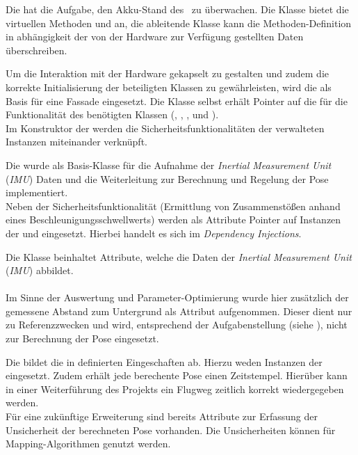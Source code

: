 
Die  hat die Aufgabe, den Akku-Stand des \Quad\ zu überwachen. Die Klasse bietet die virtuellen Methoden  und  an, die ableitende Klasse kann die Methoden-Definition in abhängigkeit der von der Hardware zur Verfügung gestellten Daten überschreiben.


Um die Interaktion mit der Hardware gekapselt zu gestalten und zudem die korrekte Initialisierung der beteiligten Klassen zu gewährleisten, wird die  als Basis für eine Fassade eingesetzt. Die Klasse selbst erhält Pointer auf die für die Funktionalität des \Quad[s] benötigten Klassen (, , ,  und ).\\
Im Konstruktor der  werden die Sicherheitsfunktionalitäten der verwalteten Instanzen miteinander verknüpft.


Die  wurde als Basis-Klasse für die Aufnahme der \textit{Inertial Measurement Unit} (\textit{IMU}) Daten und die Weiterleitung zur Berechnung und Regelung der Pose implementiert.\\
Neben der Sicherheitsfunktionalität (Ermittlung von Zusammenstößen anhand eines Beschleunigungsschwellwerts) werden als Attribute Pointer auf Instanzen der   und  eingesetzt. Hierbei handelt es sich im \textit{Dependency Injections}.


Die Klasse  beinhaltet Attribute, welche die Daten der \textit{Inertial Measurement Unit} (\textit{IMU}) abbildet.\\
\\
Im Sinne der Auswertung und Parameter-Optimierung wurde hier zusätzlich der gemessene Abstand zum Untergrund als Attribut aufgenommen. Dieser dient nur zu Referenzzwecken und wird, entsprechend der Aufgabenstellung (siehe ), nicht zur Berechnung der Pose eingesetzt.


Die  bildet die in  definierten Eingeschaften ab. Hierzu weden Instanzen der  eingesetzt. Zudem erhält jede berechente Pose einen Zeitstempel. Hierüber kann in einer Weiterführung des Projekts ein Flugweg zeitlich korrekt wiedergegeben werden.\\
Für eine zukünftige Erweiterung sind bereits Attribute zur Erfassung der Unsicherheit der berechneten Pose vorhanden. Die Unsicherheiten können für Mapping-Algorithmen genutzt werden.



